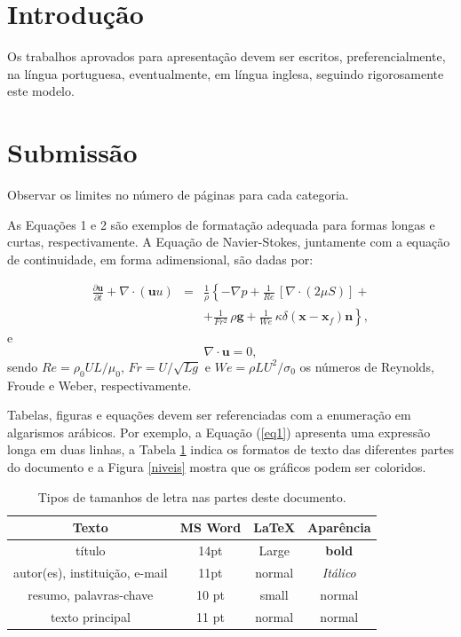 \documentclass[a4paper,11pt]{article}
\begin{document}
{%

\section*{Introdução}

Os trabalhos aprovados para apresentação devem ser escritos, preferencialmente, na língua portuguesa, eventualmente, em língua inglesa, seguindo rigorosamente este modelo.


\section*{Submissão}

Observar os limites no número de páginas para cada categoria.

As Equações 1 e 2 são exemplos de formatação adequada para formas longas e curtas, respectivamente. A Equação de Navier-Stokes, juntamente com a equação de continuidade, em forma adimensional, são dadas por:

\begin{eqnarray}
\nonumber
\frac{\partial {\mathbf u}}{\partial t} + \nabla \cdot ({\mathbf uu}) &=& \frac{1}{\rho}\left\{-\nabla p + \frac{1}{Re}\,[\nabla \cdot (2 \mu S)] +\right.
\\
&& \left.+\frac{1}{Fr^2}\,\rho {\mathbf g} +
\frac{1}{We}\,\kappa \delta ({\mathbf x} - {\mathbf x}_f) {\mathbf n}\right\},
\label{eq1}
\end{eqnarray}
e
\begin{equation}
\nabla \cdot {\mathbf u} = 0,
\label{eq2}
\end{equation}
\normalsize
sendo $Re = \rho_{0}UL/ \mu_{0}$, $Fr = U/ \sqrt{Lg}$ e $We = \rho L U^2 /\sigma_{0}$ os números de Reynolds, Froude e Weber, respectivamente.

Tabelas, figuras e equações devem ser referenciadas com a enumeração em algarismos arábicos. Por exemplo, a Equação (\ref{eq1}) apresenta uma expressão longa em duas linhas, a Tabela \ref{fonts} indica os formatos de texto das diferentes partes do documento e a Figura \ref{niveis} mostra que os gráficos podem ser coloridos.


\begin{table}[h]
\caption{{\small Tipos de tamanhos de letra nas partes deste documento.}}\label{fonts}
\centering
\begin{tabular}{|c|c|c|c|}
\hline
{\bf Texto} & {\bf MS Word} & {\bf LaTeX} & {\bf Aparência} \\
\hline
título & 14pt & Large & \textbf{bold}\\
autor(es), instituição, e-mail & 11pt & normal & \textit{Itálico}\\
resumo, palavras-chave  &	10 pt	 & small  &	{\small normal}\\
texto principal	 &11 pt & normal & normal\\
\hline
\end{tabular}
\end{table}

}
\end{document}
